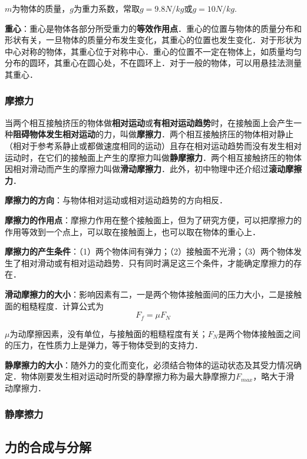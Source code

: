 $m$为物体的质量，$g$为重力系数，常取$g=9.8N/kg$或$g=10N/kg$.

\textbf{重心}：重心是物体各部分所受重力的\textbf{等效作用点}．重心的位置与物体的质量分布和形状有关，一旦物体的质量分布发生变化，其重心的位置也发生变化．对于形状为中心对称的物体，其重心位于对称中心．重心的位置不一定在物体上，如质量均匀分布的圆环，其重心在圆心处，不在圆环上．对于一般的物体，可以用悬挂法测量其重心．


\subsubsection{摩擦力}
当两个相互接触挤压的物体做\textbf{相对运动}或\textbf{有相对运动趋势}时，在接触面上会产生一种\textbf{阻碍物体发生相对运动}的力，叫做\textbf{摩擦力}．两个相互接触挤压的物体相对静止（相对于参考系静止或都做速度相同的运动）且存在相对运动趋势而没有发生相对运动时，在它们的接触面上产生的摩擦力叫做\textbf{静摩擦力}．两个相互接触挤压的物体因相对滑动而产生的摩擦力叫做\textbf{滑动摩擦力}．此外，初中物理中还介绍过\textbf{滚动摩擦力}．

\textbf{摩擦力的方向}：与物体相对运动或相对运动趋势的方向相反．

\textbf{摩擦力的作用点}：摩擦力作用在整个接触面上，但为了研究方便，可以把摩擦力的作用等效到一个点上，可以取在接触面上，也可以取在物体的重心上．

\textbf{摩擦力的产生条件}：（1）两个物体间有弹力；（2）接触面不光滑；（3）两个物体发生了相对滑动或有相对运动趋势．只有同时满足这三个条件，才能确定摩擦力的存在．

\textbf{滑动摩擦力的大小}：影响因素有二，一是两个物体接触面间的压力大小，二是接触面的粗糙程度．计算公式为
\begin{equation}
F_f=\mu F_N
\end{equation}

$\mu$为动摩擦因素，没有单位，与接触面的粗糙程度有关；$F_N$是两个物体接触面之间的压力，在性质力上是弹力，等于物体受到的支持力．

\textbf{静摩擦力的大小}：随外力的变化而变化，必须结合物体的运动状态及其受力情况确定．物体刚要发生相对运动时所受的静摩擦力称为最大静摩擦力$F_{max}$，略大于滑动摩擦力．

\subsubsection{静摩擦力}


\subsection{力的合成与分解}
